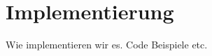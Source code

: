 \section{Implementierung}
\label{sec:implementierung}

Wie implementieren wir es. Code Beispiele etc.


